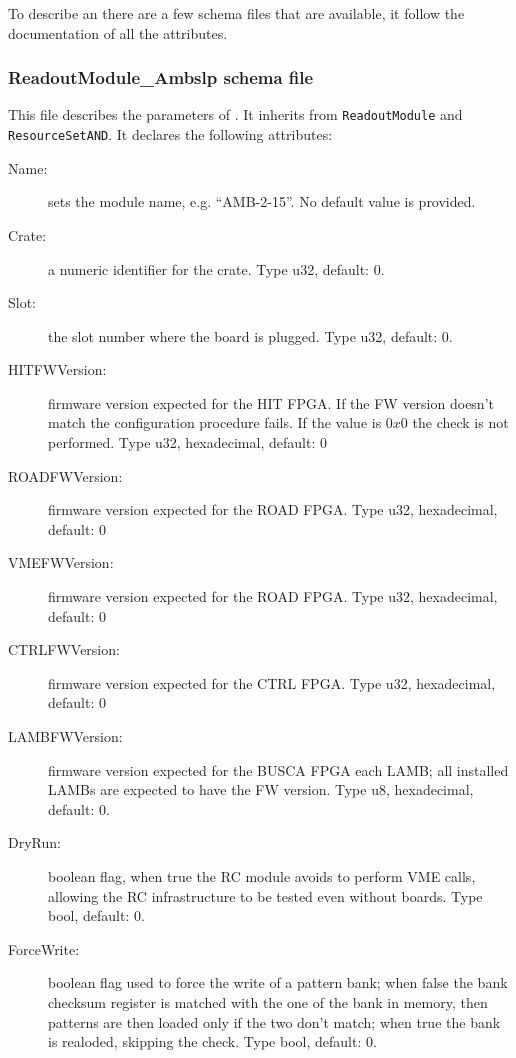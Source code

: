 To describe an \AMBoard there are a few schema files that are available, 
it follow the documentation of all the attributes.

\subsubsection{ReadoutModule\_Ambslp schema file}

This file describes the parameters of \RCModule. It inherits from 
\texttt{ReadoutModule} and \texttt{ResourceSetAND}. It declares the following
attributes:
\begin{description}
\item[Name:] sets the module name, e.g. ``AMB-2-15''. No default value is provided.

\item[Crate:] a numeric identifier for the crate. Type u32, default: 0.

\item[Slot:] the slot number where the board is plugged. Type u32, default: 0.

\item[HITFWVersion:] firmware version expected for the HIT FPGA. If the
FW version doesn't match the configuration procedure fails. 
If the value is $0x0$ the check is not performed. Type u32, hexadecimal, 
default: 0

\item[ROADFWVersion:] firmware version expected for the ROAD FPGA. 
Type u32, hexadecimal, default: 0

\item[VMEFWVersion:] firmware version expected for the ROAD FPGA. 
Type u32, hexadecimal, default: 0

\item[CTRLFWVersion:] firmware version expected for the CTRL FPGA. 
Type u32, hexadecimal, default: 0


\item[LAMBFWVersion:] firmware version expected for the BUSCA FPGA each LAMB;
all installed LAMBs are expected to have the FW version. 
Type u8, hexadecimal,  default: 0.

\item[DryRun:] boolean flag, when true the RC module avoids to perform VME calls,
allowing the RC infrastructure to be tested even without boards. Type bool,
default: 0.

\item[ForceWrite:] boolean flag used to force the write of a pattern bank; when
false the bank checksum register is matched with the one of the bank in memory, then
patterns are then loaded only if the two don't match; when true the bank is realoded,
skipping the check. Type bool, default: 0.


\end{description}

